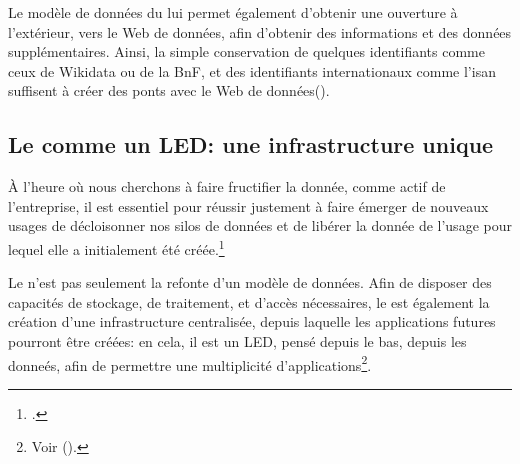 Le modèle de données du \ldd lui permet également d'obtenir une ouverture à l'extérieur, vers le Web de données, afin d'obtenir des informations et des données supplémentaires. Ainsi, la simple conservation de quelques identifiants comme ceux de Wikidata ou de la BnF, et des identifiants internationaux comme l'\ac{isan} suffisent à créer des ponts avec le Web de données().


\subsection{\label{III-B-2-c}Le \ldd comme un LED: une infrastructure unique}

\begin{citationLongue}
	À l’heure où nous cherchons à faire fructifier la donnée, comme actif de l’entreprise, il est essentiel pour réussir justement à faire émerger de nouveaux usages de décloisonner nos silos de données et de libérer la donnée de l’usage pour lequel elle a initialement été créée.\footcite{poupeau_reflexions_2018}
\end{citationLongue}

Le \ldd n'est pas seulement la refonte d'un modèle de données. Afin de disposer des capacités de stockage, de traitement, et d'accès nécessaires, le \ldd est également la création d'une infrastructure centralisée, depuis laquelle les applications futures pourront être créées: en cela, il est un LED, pensé depuis le bas, depuis les donneés, afin de permettre une multiplicité d'applications\footnote{Voir  ().}.\\


